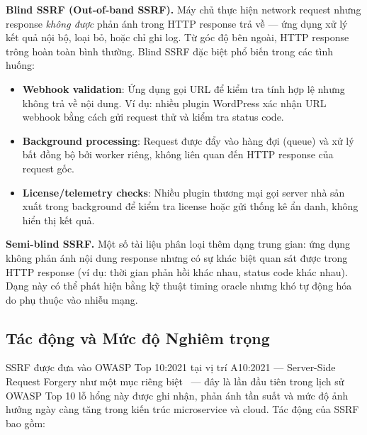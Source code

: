 \textbf{Blind SSRF (Out-of-band SSRF).} Máy chủ thực hiện network request
nhưng response \emph{không được} phản ánh trong HTTP response trả về --- ứng
dụng xử lý kết quả nội bộ, loại bỏ, hoặc chỉ ghi log. Từ góc độ bên ngoài,
HTTP response trông hoàn toàn bình thường. Blind SSRF đặc biệt phổ biến trong
các tình huống:
\begin{itemize}
    \item \textbf{Webhook validation}: Ứng dụng gọi URL để kiểm tra tính
    hợp lệ nhưng không trả về nội dung. Ví dụ: nhiều plugin WordPress xác
    nhận URL webhook bằng cách gửi request thử và kiểm tra status code.
    \item \textbf{Background processing}: Request được đẩy vào hàng đợi
    (queue) và xử lý bất đồng bộ bởi worker riêng, không liên quan đến HTTP
    response của request gốc.
    \item \textbf{License/telemetry checks}: Nhiều plugin thương mại gọi
    server nhà sản xuất trong background để kiểm tra license hoặc gửi thống
    kê ẩn danh, không hiển thị kết quả.
\end{itemize}

\textbf{Semi-blind SSRF.} Một số tài liệu phân loại thêm dạng trung gian:
ứng dụng không phản ánh nội dung response nhưng có sự khác biệt quan sát
được trong HTTP response (ví dụ: thời gian phản hồi khác nhau, status code
khác nhau). Dạng này có thể phát hiện bằng kỹ thuật timing oracle nhưng khó
tự động hóa do phụ thuộc vào nhiễu mạng.

\subsection{Tác động và Mức độ Nghiêm trọng}

SSRF được đưa vào OWASP Top 10:2021 tại vị trí A10:2021 --- Server-Side
Request Forgery như một mục riêng biệt~\cite{owasp2021top10} --- đây là lần
đầu tiên trong lịch sử OWASP Top 10 lỗ hổng này được ghi nhận, phản ánh
tần suất và mức độ ảnh hưởng ngày càng tăng trong kiến trúc microservice và
cloud. Tác động của SSRF bao gồm:

